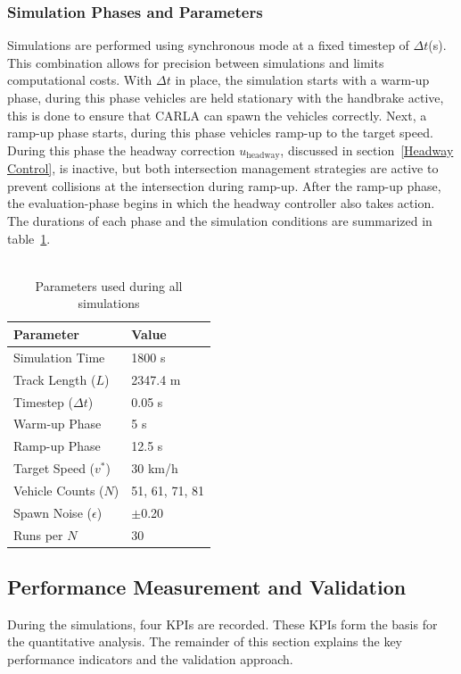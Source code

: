 \subsubsection{Simulation Phases and Parameters}
Simulations are performed using synchronous mode at a fixed timestep of \(\Delta t\)(s). This combination allows for precision between simulations and limits computational costs. With \(\Delta t\) in place, the simulation starts with a warm-up phase, during this phase vehicles are held stationary with the handbrake active, this is done to ensure that CARLA can spawn the vehicles correctly.  Next, a ramp-up phase starts, during this phase vehicles ramp-up to the target speed. During this phase the headway correction \(u_\text{headway}\), discussed in section~\ref{Headway Control}, is inactive, but both intersection management strategies are active to prevent collisions at the intersection during ramp-up. After the ramp-up phase, the evaluation-phase begins in which the headway controller also takes action. The durations of each phase and the simulation conditions are summarized in table~\ref{tab:sim_params}.
\\\\


\begin{table}[H]
\caption{Parameters used during all simulations }
\centering
\begin{tabular}{ll}
\toprule
\textbf{Parameter} & \textbf{Value} \\
\midrule
Simulation Time & 1800 s \\
Track Length (\(L\)) & 2347.4 m \\
Timestep (\(\Delta t\)) & 0.05 s \\
Warm-up Phase & 5 s \\
Ramp-up Phase & 12.5 s \\
Target Speed (\(v^*\)) & 30 km/h \\
Vehicle Counts ($N$) & 51, 61, 71, 81 \\
Spawn Noise (\(\epsilon\)) & $\pm$0.20\\
Runs per $N$ & 30 \\

\bottomrule
\end{tabular}

\label{tab:sim_params}
\end{table}




\subsection{Performance Measurement and Validation}
\label{Key Performance Indicators}
During the simulations, four KPIs are recorded. These KPIs form the basis for the quantitative analysis. The remainder of this section explains the key performance indicators and the validation approach.

